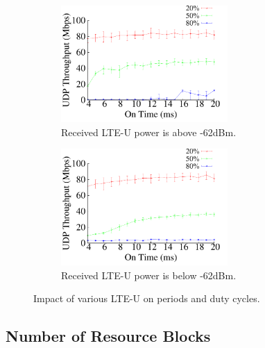 \begin{figure}[t] \centering
    \begin{subfigure}[b]{\linewidth} \centering
     \includegraphics[width=2.5in, angle=0]{./figures/impact_ontime_tplink_above} 
         \vspace{-0.0cm}
         \caption{Received LTE-U power is above -62dBm.}         
        \label{impact_ontime:a}
    \end{subfigure} %

    \begin{subfigure}[b]{\linewidth} \centering 
     \includegraphics[width=2.5in, angle=0]{./figures/impact_ontime_tplink_below}  
        \vspace{-0.0cm}
        \caption{Received LTE-U power is below -62dBm.}
        \label{impact_ontime:b}    
    \end{subfigure} 
\caption{Impact of various LTE-U on periods and duty cycles.}
\label{impact_ontime}
\vspace{-0.2cm}
\end{figure}







\subsection{Number of Resource Blocks}


